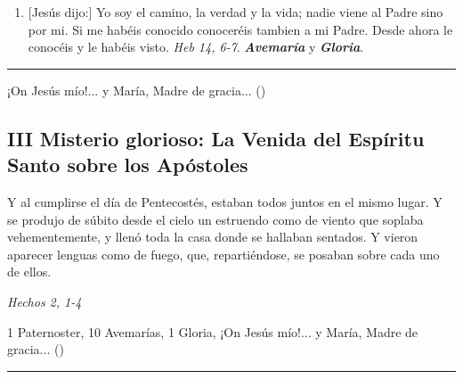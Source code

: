 \documentclass[./rosary.tex]{subfiles}
\begin{document}
\begin{enumerate}
      \item {[Jesús dijo:]} Yo soy el camino, la verdad y la vida; nadie viene al Padre sino por mi. Si me habéis conocido conoceréis tambien a mi Padre.
            Desde ahora le conocéis y le habéis visto. \emph{Heb 14, 6-7}. \textbf{\emph{Avemaría}} y \textbf{\emph{Gloria}}.
\end{enumerate}

\rule{\textwidth}{0.5pt}
¡On Jesús mío!... y María, Madre de gracia... ()

\subsection*{III Misterio glorioso: La Venida del Espíritu Santo sobre los Apóstoles}

Y al cumplirse el día de Pentecostés, estaban todos juntos en el mismo lugar. Y se produjo de súbito desde el cielo un estruendo como de viento que soplaba vehementemente,
y llenó toda la casa donde se hallaban sentados. Y vieron aparecer lenguas como de fuego, que, repartiéndose, se posaban sobre cada uno de ellos.

\begin{flushright}
      \emph{Hechos 2, 1-4}
\end{flushright}

1 Paternoster, 10 Avemarías, 1 Gloria, ¡On Jesús mío!... y María, Madre de gracia... ()

\rule{\textwidth}{0.5pt}
\end{document}
